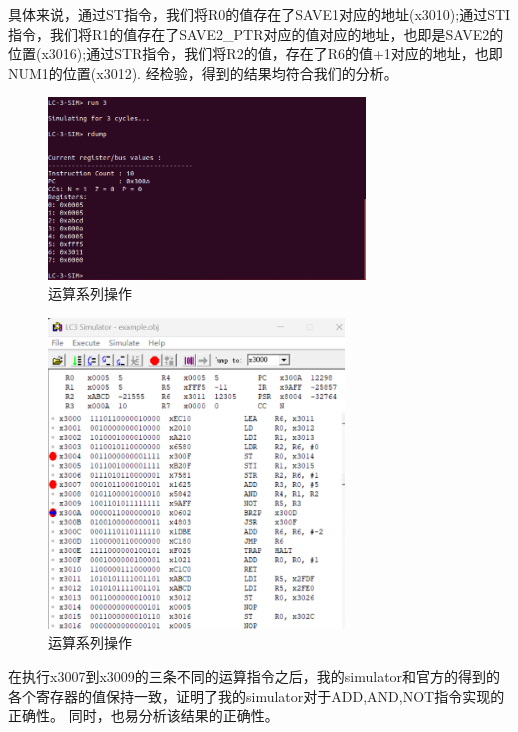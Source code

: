 \documentclass[runningheads]{llncs}
\begin{document}
具体来说，通过ST指令，我们将R0的值存在了SAVE1对应的地址(x3010);通过STI指令，我们将R1的值存在了SAVE2\_PTR对应的值对应的地址，也即是SAVE2的位置(x3016);通过STR指令，我们将R2的值，存在了R6的值+1对应的地址，也即NUM1的位置(x3012). 经检验，得到的结果均符合我们的分析。
\begin{figure}[H]
    \centering
    \includegraphics[width=0.75\textwidth]{6.png}
    \caption{运算系列操作}
    \label{fig:3-6}
\end{figure}
\vspace{-1cm}
\begin{figure}[H]
    \centering
    \includegraphics[width=0.7\textwidth]{7.png}
    \caption{运算系列操作}
    \label{fig:3-7}
\end{figure}
在执行x3007到x3009的三条不同的运算指令之后，我的simulator和官方的得到的各个寄存器的值保持一致，证明了我的simulator对于ADD,AND,NOT指令实现的正确性。
同时，也易分析该结果的正确性。
\end{document}
